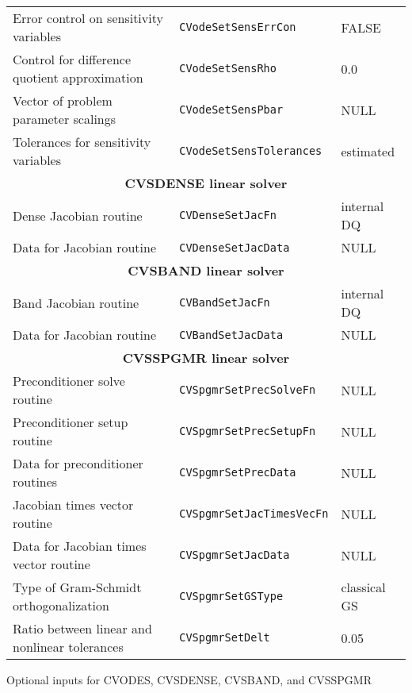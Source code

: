 \begin{acmtable}{\textwidth}
\begin{tabularx}{\textwidth}{lll}
Error control on sensitivity variables & {\tt CVodeSetSensErrCon} & FALSE \\
Control for difference quotient approximation & {\tt CVodeSetSensRho}   & 0.0 \\
Vector of problem parameter scalings & {\tt CVodeSetSensPbar}  & NULL \\
Tolerances for sensitivity variables & {\tt CVodeSetSensTolerances} & estimated \\
\hline
\multicolumn{3}{c}{\bf CVSDENSE linear solver} \\
\hline
Dense Jacobian routine & {\tt CVDenseSetJacFn} & internal DQ \\
Data for Jacobian routine & {\tt CVDenseSetJacData} & NULL \\
\hline
\multicolumn{3}{c}{\bf CVSBAND linear solver} \\
\hline
Band Jacobian routine & {\tt CVBandSetJacFn} & internal DQ \\
Data for Jacobian routine & {\tt CVBandSetJacData} & NULL \\
\hline
\multicolumn{3}{c}{\bf CVSSPGMR linear solver} \\
\hline
Preconditioner solve routine & {\tt CVSpgmrSetPrecSolveFn} & NULL \\
Preconditioner setup routine & {\tt CVSpgmrSetPrecSetupFn} & NULL \\
Data for preconditioner routines & {\tt CVSpgmrSetPrecData} & NULL \\
Jacobian times vector routine & {\tt CVSpgmrSetJacTimesVecFn} & NULL \\
Data for Jacobian times vector routine &{\tt CVSpgmrSetJacData} & NULL \\
Type of Gram-Schmidt orthogonalization & {\tt CVSpgmrSetGSType} & classical GS \\
Ratio between linear and nonlinear tolerances & {\tt CVSpgmrSetDelt} & 0.05 \\
\end{tabularx}
\caption{Optional inputs for CVODES, CVSDENSE, CVSBAND, and CVSSPGMR}
\label{t:optional_inputs}
\end{acmtable}
%
%
